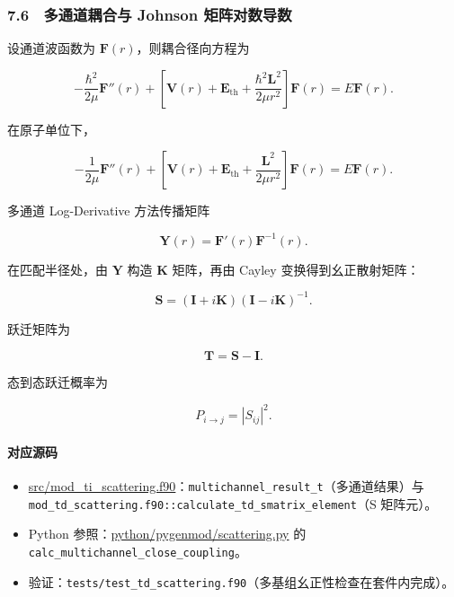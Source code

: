 \documentclass[
]{ctexbook}
\providecommand{\tightlist}{%
  \setlength{\itemsep}{0pt}\setlength{\parskip}{0pt}}
\begin{document}
\hypertarget{ux591aux901aux9053ux8026ux5408ux4e0e-johnson-ux77e9ux9635ux5bf9ux6570ux5bfcux6570}{%
\subsubsection{7.6　多通道耦合与 Johnson
矩阵对数导数}\label{ux591aux901aux9053ux8026ux5408ux4e0e-johnson-ux77e9ux9635ux5bf9ux6570ux5bfcux6570}}

设通道波函数为 \(\mathbf F(r)\)，则耦合径向方程为

\[
-\frac{\hbar^2}{2\mu}
\mathbf F''(r)
+
\left[
\mathbf V(r)
+
\mathbf E_{\mathrm{th}}
+
\frac{\hbar^2\mathbf L^2}{2\mu r^2}
\right]
\mathbf F(r)
=
E\mathbf F(r).
\]

在原子单位下，

\[
-\frac{1}{2\mu}
\mathbf F''(r)
+
\left[
\mathbf V(r)
+
\mathbf E_{\mathrm{th}}
+
\frac{\mathbf L^2}{2\mu r^2}
\right]
\mathbf F(r)
=
E\mathbf F(r).
\]

多通道 Log-Derivative 方法传播矩阵

\[
\mathbf Y(r)
=
\mathbf F'(r)\mathbf F^{-1}(r).
\]

在匹配半径处，由 \(\mathbf Y\) 构造 \(\mathbf K\) 矩阵，再由 Cayley
变换得到幺正散射矩阵：

\[
\mathbf S
=
(\mathbf I+i\mathbf K)(\mathbf I-i\mathbf K)^{-1}.
\]

跃迁矩阵为

\[
\mathbf T=\mathbf S-\mathbf I.
\]

态到态跃迁概率为

\[
P_{i\rightarrow j}=|S_{ij}|^2.
\]

\hypertarget{ux5bf9ux5e94ux6e90ux7801-29}{%
\paragraph{对应源码}\label{ux5bf9ux5e94ux6e90ux7801-29}}

\begin{itemize}
\tightlist
\item
  \href{https://github.com/l1Ha/QuantumGeneralModule/blob/main/src/mod_ti_scattering.f90}{src/mod\_ti\_scattering.f90}：\texttt{multichannel\_result\_t}（多通道结果）与
  \texttt{mod\_td\_scattering.f90::calculate\_td\_smatrix\_element}（S
  矩阵元）。
\item
  Python
  参照：\href{https://github.com/l1Ha/QuantumGeneralModule/blob/main/python/pygenmod/scattering.py}{python/pygenmod/scattering.py}
  的 \texttt{calc\_multichannel\_close\_coupling}。
\item
  验证：\texttt{tests/test\_td\_scattering.f90}（多基组幺正性检查在套件内完成）。
\end{itemize}
\end{document}
